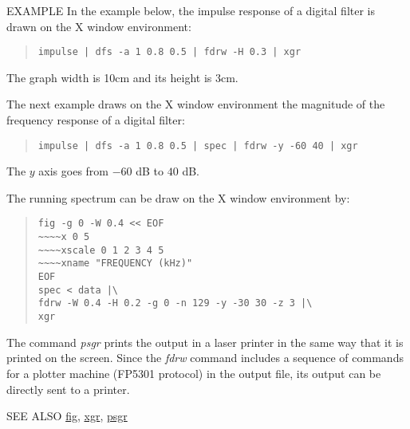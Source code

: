 \begin{qsection}{EXAMPLE}
In the example below, the impulse response of a digital filter is
drawn on the X window environment:
\begin{quote}
  \verb!impulse | dfs -a 1 0.8 0.5 | fdrw -H 0.3 | xgr!
\end{quote}
The graph width is 10cm and its height is 3cm.
\par
The next example draws on the X window environment the magnitude of
the frequency response of a digital filter:
\begin{quote}
  \verb!impulse | dfs -a 1 0.8 0.5 | spec | fdrw -y -60 40 | xgr!
\end{quote}
The $y$ axis goes from $-60$ dB to $40$ dB.
\par
The running spectrum can be draw on the X window environment by:
\begin{quote}
 \verb!fig -g 0 -W 0.4 << EOF ! \\
 \verb!~~~~x 0 5 !\\
 \verb!~~~~xscale 0 1 2 3 4 5 !\\
 \verb!~~~~xname "FREQUENCY (kHz)"!\\
 \verb!EOF!\\
 \verb!spec < data |\ !\\
 \verb!fdrw -W 0.4 -H 0.2 -g 0 -n 129 -y -30 30 -z 3 |\ !\\
 \verb!xgr !
\end{quote}
The command {\em psgr} prints the output in a laser printer in the
same way that it is printed on the screen.
Since the {\em fdrw} command includes a sequence of commands
for a plotter machine (FP5301 protocol) in the output file,
its output can be directly sent to a printer.
\end{qsection}

\begin{qsection}{SEE ALSO}
\hyperlink{fig}{fig},
\hyperlink{xgr}{xgr},
\hyperlink{psgr}{psgr}
\end{qsection}
